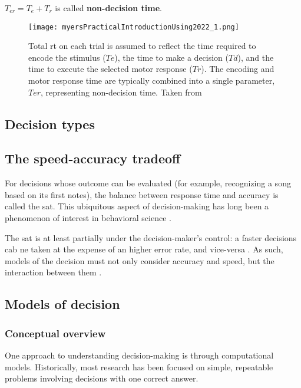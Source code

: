 $T_{er}= T_e+T_r$ is called \textbf{non-decision time}.

\begin{figure}[ht]
    \centering
    \texttt{[image: myersPracticalIntroductionUsing2022\_1.png]}
    \caption{Total \acrshort{rt} on each trial is assumed to reflect the time required to encode the stimulus ($Te$), the time to make a decision ($Td$), and the time to execute the selected motor response ($Tr$). The encoding and motor response time are typically combined into a single parameter, $Ter$, representing non-decision time. Taken from \cite{myersPracticalIntroductionUsing2022}}
\end{figure}

\subsection{Decision types}


\subsection{The speed-accuracy tradeoff}

For decisions whose outcome can be evaluated (for example, recognizing a song based on its first notes), the balance between response time and accuracy is called the \acrfull{sat}. This ubiquitous aspect of decision-making has long been a phenomenon of interest in behavioral science \cite{heitzSpeedaccuracyTradeoffHistory2014}.

The \acrshort{sat} is at least partially under the decision-maker's control: a faster decisions cab ne taken at the expense of an higher error rate, and vice-versa \cite{ratcliffDiffusionDecisionModel2016}. As such, models of the decision must not only consider accuracy and speed, but the interaction between them \cite{myersPracticalIntroductionUsing2022}.

\subsection{Models of decision}

\subsubsection{Conceptual overview}

One approach to understanding decision-making is through computational models. Historically, most research has been focused on simple, repeatable problems involving decisions with one correct answer.

